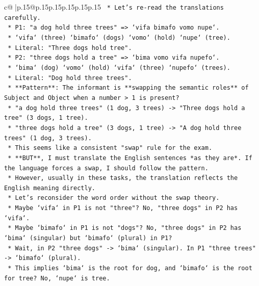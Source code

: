 \documentclass{article}
\begin{document}
{\begin{supertabular}{c@{$\;$}|p{.15\linewidth}@{}p{.15\linewidth}p{.15\linewidth}p{.15\linewidth}p{.15\linewidth}p{.15\linewidth}}
{{{\texttt{            *   Let's re{-}read the translations carefully.} \\
\texttt{                *   P1: "a dog hold three trees" => `vifa bimafo vomo nupe`.} \\
\texttt{                    *   `vifa` (three) `bimafo` (dogs) `vomo` (hold) `nupe` (tree).} \\
\texttt{                    *   Literal: "Three dogs hold tree".} \\
\texttt{                *   P2: "three dogs hold a tree" => `bima vomo vifa nupefo`.} \\
\texttt{                    *   `bima` (dog) `vomo` (hold) `vifa` (three) `nupefo` (trees).} \\
\texttt{                    *   Literal: "Dog hold three trees".} \\
\texttt{            *   **Pattern**: The informant is **swapping the semantic roles** of Subject and Object when a number > 1 is present?} \\
\texttt{                *   "a dog hold three trees" (1 dog, 3 trees) {-}> "Three dogs hold a tree" (3 dogs, 1 tree).} \\
\texttt{                *   "three dogs hold a tree" (3 dogs, 1 tree) {-}> "A dog hold three trees" (1 dog, 3 trees).} \\
\texttt{            *   This seems like a consistent "swap" rule for the exam.} \\
\texttt{            *   **BUT**, I must translate the English sentences *as they are*. If the language forces a swap, I should follow the pattern.} \\
\texttt{            *   However, usually in these tasks, the translation reflects the English meaning directly.} \\
\texttt{            *   Let's reconsider the word order without the swap theory.} \\
\texttt{                *   Maybe `vifa` in P1 is not "three"? No, "three dogs" in P2 has `vifa`.} \\
\texttt{                *   Maybe `bimafo` in P1 is not "dogs"? No, "three dogs" in P2 has `bima` (singular) but `bimafo` (plural) in P1?} \\
\texttt{                *   Wait, in P2 "three dogs" {-}> `bima` (singular). In P1 "three trees" {-}> `bimafo` (plural).} \\
\texttt{                *   This implies `bima` is the root for dog, and `bimafo` is the root for tree? No, `nupe` is tree.} \\
}}}
\end{supertabular}}
\end{document}
